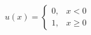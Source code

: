 \documentclass[preview]{standalone}
\begin{document}
\begin{center}
$u(x)=\begin{cases} 0, & x < 0 \\ 1, & x \geq 0 \end{cases}$
\end{center}
\end{document}
